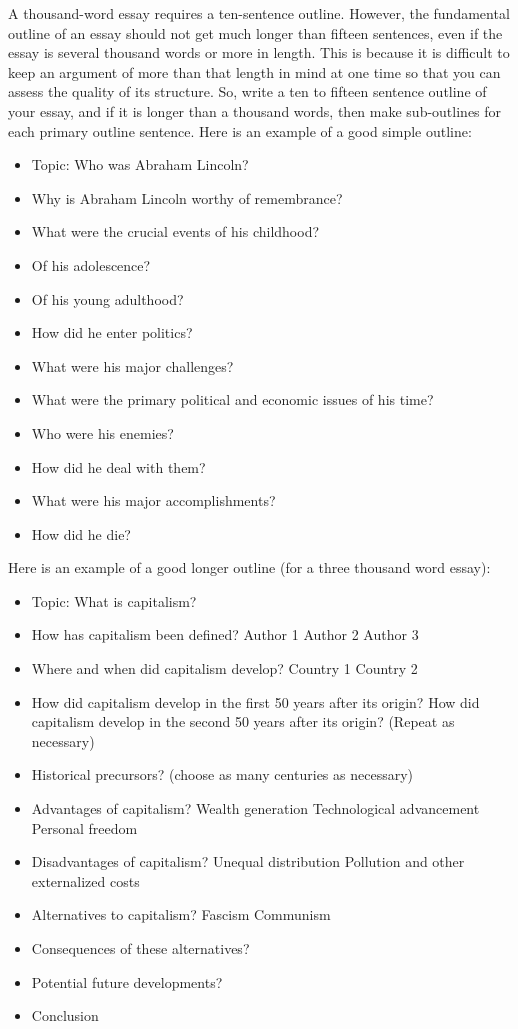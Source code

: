 \documentclass{article}
\begin{document}
A thousand-word essay requires a ten-sentence outline. However, the
fundamental outline of an essay should not get much longer than fifteen
sentences, even if the essay is several thousand words or more in
length. This is because it is difficult to keep an argument of more than
that length in mind at one time so that you can assess the quality of
its structure. So, write a ten to fifteen sentence outline of your
essay, and if it is longer than a thousand words, then make sub-outlines
for each primary outline sentence. Here is an example of a good simple
outline:

\begin{itemize}
  \item Topic: Who was Abraham Lincoln?
  \item Why is Abraham Lincoln worthy of remembrance?
  \item What were the crucial events of his childhood?
  \item Of his adolescence?
  \item Of his young adulthood?
  \item How did he enter politics?
  \item What were his major challenges?
  \item What were the primary political and economic issues of his time?
  \item Who were his enemies?
  \item How did he deal with them?
  \item What were his major accomplishments?
  \item How did he die?
\end{itemize}

Here is an example of a good longer outline (for a three thousand word
essay):

\begin{itemize}
  \item Topic: What is capitalism?
  \item How has capitalism been defined?
    \subitem Author 1
    \subitem Author 2
    \subitem Author 3
  \item Where and when did capitalism develop?
    \subitem Country 1
    \subitem Country 2
  \item How did capitalism develop in the first 50 years after its origin?
    \subitem How did capitalism develop in the second 50 years after its origin?
    \subitem (Repeat as necessary)
  \item Historical precursors?
    \subitem (choose as many centuries as necessary)
  \item Advantages of capitalism?
    \subitem Wealth generation
    \subitem Technological advancement
    \subitem Personal freedom
  \item Disadvantages of capitalism?
    \subitem Unequal distribution
    \subitem Pollution and other externalized costs
  \item Alternatives to capitalism?
    \subitem Fascism
    \subitem Communism
  \item Consequences of these alternatives?
  \item Potential future developments?
  \item Conclusion
\end{itemize}
\end{document}
